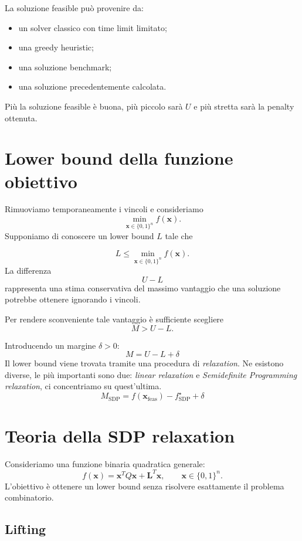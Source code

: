 \documentclass[11pt,a4paper]{report}
\begin{document}
La soluzione feasible può provenire da:

\begin{itemize}
    \item un solver classico con time limit limitato;
    \item una greedy heuristic;
    \item una soluzione benchmark;
    \item una soluzione precedentemente calcolata.
\end{itemize}

Più la soluzione feasible è buona, più piccolo sarà $U$ e più stretta
sarà la penalty ottenuta.

\section{Lower bound della funzione obiettivo}
Rimuoviamo temporaneamente i vincoli e consideriamo
\[
\min_{\mathbf x\in\{0,1\}^n}
f(\mathbf x).
\]
Supponiamo di conoscere un lower bound $L$ tale che

\[
L
\leq
\min_{\mathbf x\in\{0,1\}^n}
f(\mathbf x).
\]
La differenza
\[
U-L
\]
rappresenta una stima conservativa del massimo vantaggio che una soluzione
potrebbe ottenere ignorando i vincoli. \newline

Per rendere sconveniente tale vantaggio è sufficiente scegliere
\[
M>U-L.
\]

Introducendo un margine $\delta>0$:
\[
\boxed{
M
=
U-L+\delta
}
\]
Il lower bound viene trovata tramite una procedura di \emph{relaxation}.
Ne esistono diverse, le più importanti sono due: \emph{linear relaxation} e 
\emph{Semidefinite Programming relaxation}, ci concentriamo su quest'ultima. 
\[
\boxed{
M_{\mathrm{SDP}}
=
f(\mathbf x_{\mathrm{feas}})
-
f^\star_{\mathrm{SDP}}
+
\delta
}
\]

\section{Teoria della SDP relaxation}

Consideriamo una funzione binaria quadratica generale:
\[
f(\mathbf x)
=
\mathbf x^TQ\mathbf x
+
\mathbf L^T\mathbf x,
\qquad
\mathbf x\in\{0,1\}^n.
\]
L'obiettivo è ottenere un lower bound senza risolvere esattamente il
problema combinatorio.

\subsection{Lifting}
\end{document}
